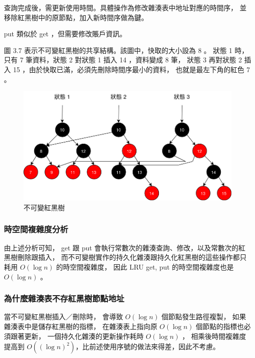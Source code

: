 查詢完成後，需更新使用時間。具體操作為修改雜湊表中地址對應的時間序，
並移除紅黑樹中的原節點，加入新時間序做為鍵。

put 類似於 get ，但需要修改賬戶資訊。

圖 3.7 表示不可變紅黑樹的共享結構。該圖中，快取的大小設為 8 。
狀態 1 時，只有 7 筆資料，狀態 2 對狀態 1 插入 14 ，資料變成 8 筆，
狀態 3 再對狀態 2 插入 15 ，由於快取已滿，必須先刪除時間序最小的資料，
也就是最左下角的紅色 7 。

\begin{figure}[h!]
\includegraphics[width=\textwidth]{不可變紅黑樹}
\caption{不可變紅黑樹}
\end{figure}

\subsubsection{時空間複雜度分析}
由上述分析可知， get 跟 put 會執行常數次的雜湊查詢、修改，以及常數次的紅黑樹刪除跟插入，
而不可變樹實作的持久化雜湊跟持久化紅黑樹的這些操作都只耗用 $O(\log n)$ 的時空間複雜度，
因此 LRU get, put 的時空間複雜度也是 $O(\log n)$ 。

\subsubsection{為什麼雜湊表不存紅黑樹節點地址}
當不可變紅黑樹插入／刪除時，
會導致 $O(\log n)$ 個節點發生路徑複製，
如果雜湊表中是儲存紅黑樹的指標，
在雜湊表上指向原 $O(\log n)$ 個節點的指標也必須跟著更新，
一個持久化雜湊的更新操作耗時 $O(\log n)$ ，
相乘後時間複雜度提高到 $O((\log n)^2)$，比前述使用序號的做法來得差，因此不考慮。


